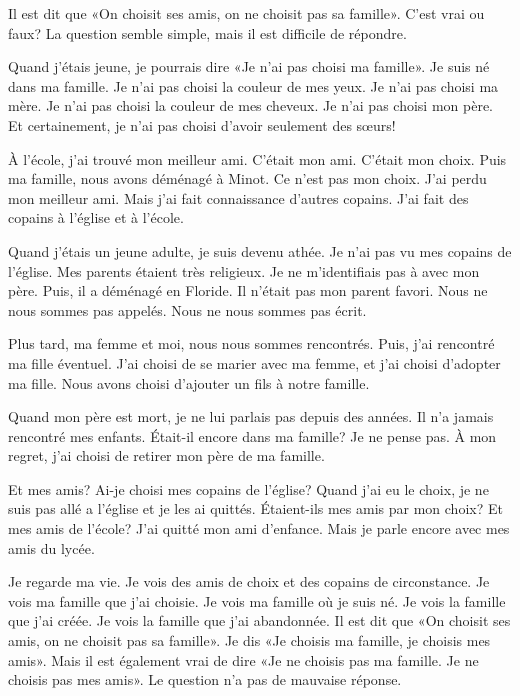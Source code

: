 \documentclass[letterpaper]{article}
\begin{document}
\doublespacing
Il est dit que «On choisit ses amis, on ne choisit pas sa famille». C'est vrai ou faux? La question semble simple, mais il est difficile de répondre.

Quand j'étais jeune, je pourrais dire «Je n'ai pas choisi ma famille».
Je suis né dans ma famille.
Je n'ai pas choisi la couleur de mes yeux.
Je n'ai pas choisi ma mère.
Je n'ai pas choisi la couleur de mes cheveux.
Je n'ai pas choisi mon père.
Et certainement, je n'ai pas choisi d'avoir seulement des sœurs!

À l'école, j'ai trouvé mon meilleur ami. C'était mon ami. C'était mon choix. Puis ma famille, nous avons déménagé à Minot. Ce n'est pas mon choix. J'ai perdu mon meilleur ami. Mais j'ai fait connaissance d'autres copains. J'ai fait des copains à l'église et à l'école.

Quand j'étais un jeune adulte, je suis devenu athée. Je n'ai pas vu mes copains de l'église. Mes parents étaient très religieux. Je ne m'identifiais pas à avec mon père. Puis, il a déménagé en Floride. Il n'était pas mon parent favori. Nous ne nous sommes pas appelés. Nous ne nous sommes pas écrit.

Plus tard, ma femme et moi, nous nous sommes rencontrés. Puis, j'ai rencontré ma fille éventuel. J'ai choisi de se marier avec ma femme, et j'ai choisi d'adopter ma fille. Nous avons choisi d'ajouter un fils à notre famille.

Quand mon père est mort, je ne lui parlais pas depuis des années. Il n'a jamais rencontré mes enfants. Était-il encore dans ma famille? Je ne pense pas. À mon regret, j'ai choisi de retirer mon père de ma famille.

Et mes amis? Ai-je choisi mes copains de l'église? Quand j'ai eu le choix, je ne suis pas allé a l'église et je les ai quittés. Étaient-ils mes amis par mon choix? Et mes amis de l'école? J'ai quitté mon ami d'enfance. Mais je parle encore avec mes amis du lycée.

Je regarde ma vie. Je vois des amis de choix et des copains de circonstance. Je vois ma famille que j'ai choisie. Je vois ma famille où je suis né. Je vois la famille que j'ai créée. Je vois la famille que j'ai abandonnée. Il est dit que 
«On choisit ses amis, on ne choisit pas sa famille». Je dis «Je choisis ma famille, je choisis mes amis». Mais il est également vrai de dire «Je ne choisis pas ma famille. Je ne choisis pas mes amis». Le question n'a pas de mauvaise réponse.
\end{document}
